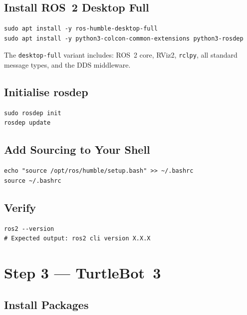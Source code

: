 \documentclass[12pt,a4paper]{report}
\newcommand{\pkg}[1]{\texttt{\color{RoyalBlue}#1}}
\begin{document}
\subsection{Install ROS~2 Desktop Full}

\begin{lstlisting}[style=bashstyle, caption={Install ROS~2 and colcon}]
sudo apt install -y ros-humble-desktop-full
sudo apt install -y python3-colcon-common-extensions python3-rosdep
\end{lstlisting}

The \texttt{desktop-full} variant includes: ROS~2 core, RViz2, \pkg{rclpy},
all standard message types, and the DDS middleware.

\subsection{Initialise rosdep}

\begin{lstlisting}[style=bashstyle, caption={Initialise rosdep}]
sudo rosdep init
rosdep update
\end{lstlisting}

\subsection{Add Sourcing to Your Shell}

\begin{lstlisting}[style=bashstyle, caption={Persistent shell sourcing}]
echo "source /opt/ros/humble/setup.bash" >> ~/.bashrc
source ~/.bashrc
\end{lstlisting}

\subsection{Verify}

\begin{lstlisting}[style=bashstyle, caption={Verify ROS~2 installation}]
ros2 --version
# Expected output: ros2 cli version X.X.X
\end{lstlisting}

\section{Step 3 --- TurtleBot~3}

\subsection{Install Packages}
\end{document}

